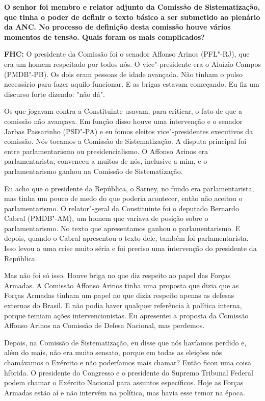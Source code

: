 \textbf{O senhor foi membro e relator adjunto da Comissão de
Sistematização, que tinha o poder de definir o texto básico a ser
submetido ao plenário da ANC. No processo de definição desta comissão
houve vários momentos de tensão. Quais foram os mais complicados?}

\textbf{FHC:} O presidente da Comissão foi o senador Affonso Arinos
(PFL"-RJ), que era um homem respeitado por todos nós. O vice"-presidente
era o Aluízio Campos (PMDB"-PB). Os dois eram pessoas de idade avançada.
Não tinham o pulso necessário para fazer aquilo funcionar. E as brigas
estavam começando. Eu fiz um discurso forte dizendo: "não dá".

Os que jogavam contra a Constituinte usavam, para criticar, o fato de
que a comissão não avançava. Em função disso houve uma intervenção e o
senador Jarbas Passarinho (PSD"-PA) e eu fomos eleitos vice"-presidentes
executivos da comissão. Nós tocamos a Comissão de Sistematização. A
disputa principal foi entre parlamentarismo ou presidencialismo. O
Affonso Arinos era parlamentarista, convenceu a muitos de nós, inclusive
a mim, e o parlamentarismo ganhou na Comissão de Sistematização.

Eu acho que o presidente da República, o Sarney, no fundo era
parlamentarista, mas tinha um pouco de medo do que poderia acontecer,
então não aceitou o parlamentarismo. O relator"-geral da Constituinte foi
o deputado Bernardo Cabral (PMDB"-AM), um homem que variava de posição
sobre o parlamentarismo. No texto que apresentamos ganhou o
parlamentarismo. E depois, quando o Cabral apresentou o texto dele,
também foi parlamentarista. Isso levou a uma crise muito séria e foi
preciso uma intervenção do presidente da República.

Mas não foi só isso. Houve briga no que diz respeito ao papel das Forças
Armadas. A Comissão Affonso Arinos tinha uma proposta que dizia que as
Forças Armadas tinham um papel no que dizia respeito apenas as defesas
externas do Brasil. E não podia haver qualquer referência à política
interna, porque temiam ações intervencionistas. Eu apresentei a proposta
da Comissão Affonso Arinos na Comissão de Defesa Nacional, mas perdemos.

Depois, na Comissão de Sistematização, eu disse que nós havíamos perdido
e, além do mais, não era muito sensato, porque em todas as eleições nós
chamávamos o Exército e não poderíamos mais chamar? Então ficou uma
coisa híbrida. O presidente do Congresso e o presidente do Supremo
Tribunal Federal podem chamar o Exército Nacional para assuntos
específicos. Hoje as Forças Armadas estão aí e não intervêm na política,
mas havia esse temor na época.

